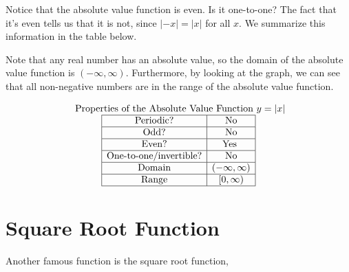 \documentclass[nooutcomes]{ximera}
\begin{document}
Notice that the absolute value function is even. Is it one-to-one? The fact that it's even tells us that it is not, since $|-x| = |x|$ for all $x$. We summarize this information in the table below.
 
 
Note that any real number has an absolute value, so the domain of the absolute value function is $(-\infty, \infty)$. Furthermore, by looking at the graph, we can see that all non-negative numbers are in the range of the absolute value function.
 
\[
\begin{array}{c }
\text{ Properties of the Absolute Value Function } y=|x| \\
\begin{array}{|c|c|}
 \hline
\text{Periodic?} & \text{No} \\ \hline
\text{Odd?} & \text{No} \\ \hline
\text{Even?} & \text{Yes } \\ \hline
\text{One-to-one/invertible?} & \text{No}\\ \hline
\text{Domain} & (-\infty,\infty)\\ \hline
\text{Range} & [0,\infty)\\ \hline
\end{array}
\end{array}
\]
 
 
\newpage
 
 
\section{Square Root Function}
Another famous function is the square root function,
 
\begin{center}
\end{center}
 
\begin{center}
\end{center}
 
\end{document}
